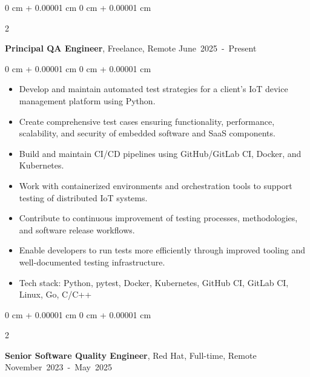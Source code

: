 \documentclass[10pt, a4paper]{article}
\newenvironment{highlights}{
    \begin{itemize}[
        topsep=0.05 cm,
        parsep=0.05 cm,
        partopsep=0pt,
        itemsep=0pt,
        leftmargin=0 cm + 10pt
    ]
}{
    \end{itemize}
} %
\newenvironment{onecolentry}{
    \begin{adjustwidth}{
        0 cm + 0.00001 cm
    }{
        0 cm + 0.00001 cm
    }
}{
    \end{adjustwidth}
} %
\newenvironment{twocolentry}[2][]{
    \onecolentry
    \def\secondColumn{#2}
    \setcolumnwidth{\fill, 4.5 cm}
    \begin{paracol}{2}
}{
    \switchcolumn \raggedleft \secondColumn
    \end{paracol}
    \endonecolentry
} %
\begin{document}
        \begin{twocolentry}{
            \small\mbox{June 2025 - Present}
        }
            \textbf{Principal QA Engineer}, Freelance, Remote\end{twocolentry}

        \vspace{0.10 cm}
        \begin{onecolentry}
            \begin{highlights}
                \item Develop and maintain automated test strategies for a client's IoT device management platform using Python.
                \item Create comprehensive test cases ensuring functionality, performance, scalability, and security of embedded software and SaaS components.
                \item Build and maintain CI/CD pipelines using GitHub/GitLab CI, Docker, and Kubernetes.
                \item Work with containerized environments and orchestration tools to support testing of distributed IoT systems.
                \item Contribute to continuous improvement of testing processes, methodologies, and software release workflows.
                \item Enable developers to run tests more efficiently through improved tooling and well-documented testing infrastructure.
                \item Tech stack: Python, pytest, Docker, Kubernetes, GitHub CI, GitLab CI, Linux, Go, C/C++
            \end{highlights}
        \end{onecolentry}

        \vspace{0.5 cm}

        \begin{twocolentry}{
            \small\mbox{November 2023 - May 2025}
        }
            \textbf{Senior Software Quality Engineer}, Red Hat, Full-time, Remote\end{twocolentry}

        \vspace{0.10 cm}
\end{document}
